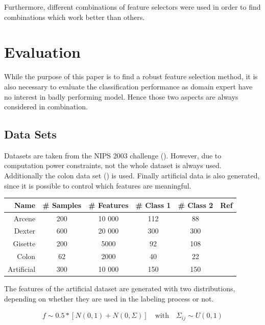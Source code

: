 \documentclass[twoside,11pt]{article}
\begin{document}
Furthermore, different combinations of feature selectors were used in order to find combinations which work better than others.

\section{Evaluation}

While the purpose of this paper is to find a robust feature selection method, it is also necessary to evaluate the classification performance as domain expert have no interest in badly performing model. Hence those two aspects are always considered in combination.

\subsection{Data Sets}
Datasets are taken from the NIPS 2003 challenge (\cite{NIPS}). However, due to computation power constraints, not the whole dataset is always used. Additionally the colon data set (\cite{alon1999broad}) is used. Finally artificial data is also generated, since it is possible to control which features are meaningful. 

\begin{center}
    \begin{tabular}{| r | c | c | c | c | c |}
    \hline
    Name & \# Samples & \# Features & \# Class 1 & \# Class 2 & Ref\\ \hline
    Arcene & 200 & 10 000 & 112 & 88 & \cite{NIPS} \\
    Dexter & 600 & 20 000 & 300 & 300 & \cite{NIPS} \\
    Gisette & 200 & 5000 & 92 & 108 & \cite{NIPS} \\
    Colon & 62 & 2000 & 40 & 22 &  \cite{alon1999broad} \\
    Artificial & 300 & 10 000 & 150 & 150 & \\
    \hline
    \end{tabular}
\end{center}

The features of the artificial dataset are generated with two distributions, depending on whether they are used in the labeling process or not.

\begin{align}
f \sim0.5 * \left[ N(0, 1) + N(0, \Sigma) \right]  \quad \text{with} \quad \Sigma_{ij} \sim U(0,1)
\end{align}
\end{document}
